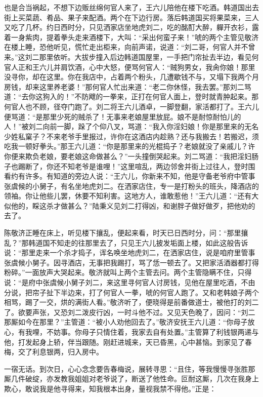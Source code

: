 也是合当祸起，不想下边贩丝绵何官人来了，王六儿陪他在楼下吃酒。韩道国出去街上买菜蔬、肴品、果子来配酒。两个在下边行房。落后韩道国买将果菜来，三人又吃了几杯。约日西时分，只见洒家店坐地虎刘二，吃的酩酊大醉，軃开衣衫，露着一身紫肉，提着拳头走来酒楼下，大叫：“采出何蛮子来！”唬的两个主管见敬济在楼上睡，恐他听见，慌忙走出柜来，向前声诺，说道：“刘二哥，何官人并不曾来。”这刘二那里依听。大拔步撞入后边韩道国屋里，一手把门帘扯去半边，看见何官人正和王六儿并肩饮酒，心中大怒，便骂何官人：“贼狗男女，我肏你娘！那里没寻你，却在这里。你在我店中，占着两个粉头，几遭歇钱不与，又塌下我两个月房钱，却来这里养老婆！”那何官人忙出来道：“老二你休怪，我去罢。”那刘二骂道：“去你这狗入的！”不防飕的一拳来，正打在何官人面上，登时就青肿起来。那何官人也不顾，径夺门跑了。刘二将王六儿酒卓，一脚登翻，家活都打了。王六儿便骂道：“是那里少死的贼杀了！无事来老娘屋里放屁。娘不是耐惊耐怕儿的人！”被刘二向前一脚，跺了个仰八叉，骂道：“我入你淫妇娘！你是那里来的无名少姓私窠子？不来老爷手里报过，许你在这酒店内趁熟？还与我搬去！若搬迟，须吃我一顿好拳头。”那王六儿道：“你是那里来的光棍捣子？老娘就没了亲戚儿？许你便来欺负老娘，要老娘这命做甚么？”一头撞倒哭起来。刘二骂道：“我把淫妇肠子也踢断了，你还不知老爷是谁哩！”这里喧乱，两边邻舍并街上过往人，登时围看约有许多。有知道的旁边人说：“王六儿，你新来不知，他是守备老爷府中管事张虞候的小舅子，有名坐地虎刘二。在洒家店住，专一是打粉头的班头，降酒店的领袖。你让他些儿罢，休要不知利害。这地方人，谁敢惹他！”王六儿道：“还有大似他的，睬这杀才做甚么？”陆秉义见刘二打得凶，和谢胖子做好做歹，把他劝的去了。

陈敬济正睡在床上，听见楼下攘乱，便起来看，时天已日西时分，问：“那里攘乱？”那韩道国不知走的往那里去了，只见王六儿披发垢面上楼，如此这般告诉说：“那里走来一个杀才捣子，诨名唤坐地虎刘二，在洒家店住，说是咱府里管事张虞候小舅子。因寻酒店，无事把我踢打，骂了恁一顿去了。又把家活酒器都打得粉碎。”一面放声大哭起来。敬济就叫上两个主管去问。两个主管隐瞒不住，只得说：“是府中张虞候小舅子刘二，来这里寻何官人讨房钱，见他在屋里吃酒，不由分说，把帘子扯下半边来，打了何官人一拳，唬的何官人跑了。又和老韩娘子两个相骂，踢了一交，烘的满街人看。”敬济听了，便晓得是前番做道士，被他打的刘二了。欲要声张，又恐刘二泼皮行凶，一时斗他不过。又见天色晚了，因问：“刘二那厮如今在那里？”主管道：“被小人劝他回去了。”敬济安抚王六儿道：“你母子放心，有我哩，不妨事。你母子只情住着，我家去自有处置。”主管算了利钱银两递与他，打发起身上轿，伴当跟随。刚赶进城来，天已昏黑，心中甚恼。到家见了春梅，交了利息银两，归入房中。

一宿无话。到次日，心心念念要告春梅说，展转寻思：“且住，等我慢慢寻张胜那厮几件破绽，亦发教我姐姐对老爷说了，断送了他性命。叵耐这厮，几次在我身上欺心，敢说我是他寻得来，知我根本出身，量视我禁不得他。”正是：

